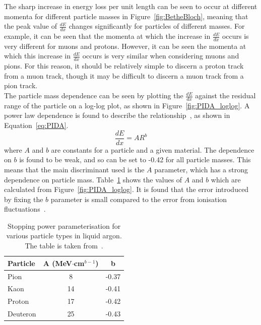 The sharp increase in energy loss per unit length can be seen to occur at different momenta for different particle masses in Figure~\ref{fig:BetheBloch}, meaning that the peak value of $\frac{dE}{dx}$ changes significantly for particles of different masses. For example, it can be seen that the momenta at which the increase in $\frac{dE}{dx}$ occurs is very different for muons and protons. However, it can be seen the momenta at which this increase in $\frac{dE}{dx}$ occurs is very similar when considering muons and pions. For this reason, it should be relatively simple to discern a proton track from a muon track, though it may be difficult to discern a muon track from a pion track. \\

The particle mass dependence can be seen by plotting the $\frac{dE}{dx}$ against the residual range of the particle on a log-log plot, as shown in Figure~\ref{fig:PIDA_loglog}. A power law dependence is found to describe the relationship~\citep{PIDA_Paper}, as shown in Equation~\ref{eq:PIDA}.
\begin{equation}
  \label{eq:PIDA}
  \frac{dE}{dx} = A R^b
\end{equation}
where $A$ and $b$ are constants for a particle and a given material. The dependence on $b$ is found to be weak, and so can be set to -0.42 for all particle masses. This means that the main discriminant used is the $A$ parameter, which has a strong dependence on particle mass. Table~\ref{tab:PIDAVals} shows the values of $A$ and $b$ which are calculated from Figure~\ref{fig:PIDA_loglog}. It is found that the error introduced by fixing the $b$ parameter is small compared to the error from ionisation fluctuations~\citep{PIDA_Paper}. \\

\begin{table}
\caption[Stopping power parameterisation for various particle types in liquid argon]
        {Stopping power parameterisation for various particle types in liquid argon. The table is taken from~\citep{PIDA_Paper}.}
\centering
\label{tab:PIDAVals}
\begin{tabular}{l c c}
\toprule
{Particle} & {A (MeV$\cdot$cm$^{b-1}$)} & {b} \\ 
\midrule
Pion     & 8  & -0.37 \\

Kaon     & 14 & -0.41 \\

Proton   & 17 & -0.42 \\

Deuteron & 25 & -0.43 \\
\bottomrule
\end{tabular}
\end{table}

